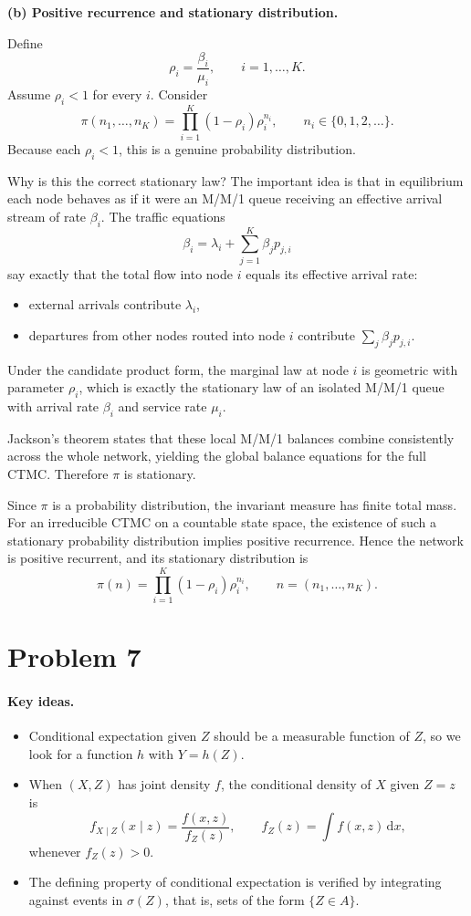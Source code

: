 \documentclass[11pt]{article}
\newcommand{\1}{\mathbf{1}}
\newcommand{\dd}{\,\mathrm{d}}
\begin{document}
\textbf{(b) Positive recurrence and stationary distribution.}

Define
\[
    \rho_i = \frac{\beta_i}{\mu_i}, \qquad i=1,\dots,K.
\]
Assume \(\rho_i<1\) for every \(i\). Consider
\[
    \pi(n_1,\dots,n_K)
    =
    \prod_{i=1}^K (1-\rho_i)\rho_i^{n_i},
    \qquad n_i \in \{0,1,2,\dots\}.
\]
Because each \(\rho_i<1\), this is a genuine probability distribution.

Why is this the correct stationary law? The important idea is that in equilibrium each node behaves as if it were an M/M/1 queue receiving an effective arrival stream of rate \(\beta_i\). The traffic equations
\[
    \beta_i = \lambda_i + \sum_{j=1}^K \beta_j p_{j,i}
\]
say exactly that the total flow into node \(i\) equals its effective arrival rate:
\begin{itemize}
    \item external arrivals contribute \(\lambda_i\),
    \item departures from other nodes routed into node \(i\) contribute \(\sum_j \beta_j p_{j,i}\).
\end{itemize}
Under the candidate product form, the marginal law at node \(i\) is geometric with parameter \(\rho_i\), which is exactly the stationary law of an isolated M/M/1 queue with arrival rate \(\beta_i\) and service rate \(\mu_i\).

Jackson's theorem states that these local M/M/1 balances combine consistently across the whole network, yielding the global balance equations for the full CTMC. Therefore \(\pi\) is stationary.

Since \(\pi\) is a probability distribution, the invariant measure has finite total mass. For an irreducible CTMC on a countable state space, the existence of such a stationary probability distribution implies positive recurrence. Hence the network is positive recurrent, and its stationary distribution is
\[
    \pi(n)
    =
    \prod_{i=1}^K (1-\rho_i)\rho_i^{n_i},
    \qquad
    n=(n_1,\dots,n_K).
\]

\section*{Problem 7}
\paragraph{Key ideas.}
\begin{itemize}
    \item Conditional expectation given \(Z\) should be a measurable function of \(Z\), so we look for a function \(h\) with \(Y=h(Z)\).
    \item When \((X,Z)\) has joint density \(f\), the conditional density of \(X\) given \(Z=z\) is
    \[
        f_{X\mid Z}(x\mid z)=\frac{f(x,z)}{f_Z(z)},
        \qquad
        f_Z(z)=\int f(x,z)\dd x,
    \]
    whenever \(f_Z(z)>0\).
    \item The defining property of conditional expectation is verified by integrating against events in \(\sigma(Z)\), that is, sets of the form \(\{Z\in A\}\).
\end{itemize}
\end{document}
